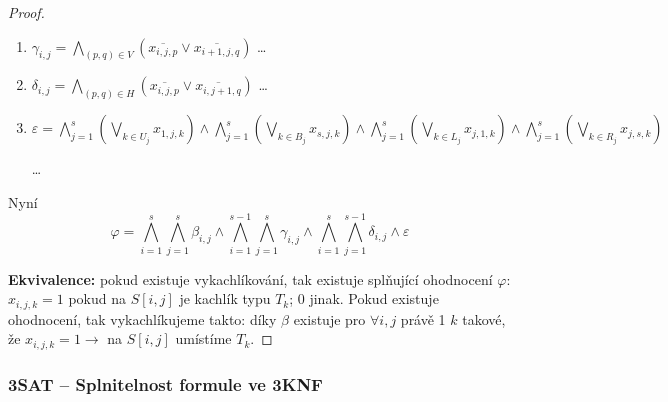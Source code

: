 \documentclass[11pt]{report} %
\numberwithin{equation}{section}
\begin{document}
\begin{proof}
\begin{enumerate}
\begin{enumerate}
		\item $\gamma_{i,j} = \bigwedge\limits_{(p,q)\in V} (\overline{x_{i,j,p}} \vee \overline{x_{i+1,j,q}})$ \quad\dots\quad {}
		
		\item $\delta_{i,j} = \bigwedge\limits_{(p,q)\in H} (\overline{x_{i,j,p}} \vee \overline{x_{i,j+1,q}})$ \quad\dots\quad {}
		
		\item $\varepsilon = \bigwedge\limits_{j=1}^{s}\left(\bigvee\limits_{k\in U_j} x_{1,j,k} \right) \wedge \bigwedge\limits_{j=1}^{s}\left(\bigvee\limits_{k\in B_j} x_{s,j,k} \right) \wedge \bigwedge\limits_{j=1}^{s}\left(\bigvee\limits_{k\in L_j} x_{j,1,k} \right) \wedge \bigwedge\limits_{j=1}^{s}\left(\bigvee\limits_{k\in R_j} x_{j,s,k} \right)$ 
		\medskip
		
		\quad\dots\quad {}
	\end{enumerate}

	Nyní
	$$\varphi = \bigwedge\limits_{i=1}^{s}\bigwedge\limits_{j=1}^{s} \beta_{i,j} \wedge \bigwedge\limits_{i=1}^{s-1}\bigwedge\limits_{j=1}^{s} \gamma_{i,j} \wedge \bigwedge\limits_{i=1}^{s}\bigwedge\limits_{j=1}^{s-1}\delta_{i,j} \wedge \varepsilon$$
\end{enumerate}

\textbf{Ekvivalence:} pokud existuje vykachlíkování, tak existuje splňující ohodnocení $\varphi$: $x_{i,j,k} = 1$ pokud na $S[i,j]$ je kachlík typu $T_k$; 0 jinak. Pokud existuje ohodnocení, tak vykachlíkujeme takto: díky $\beta$ existuje pro $\forall i,j$ právě 1 $k$ takové, že $x_{i,j,k} = 1 \rightarrow$ na $S[i,j]$ umístíme $T_k$.
\end{proof}

\subsubsection{3SAT -- Splnitelnost formule ve 3KNF}
\begin{minipage}{\textwidth}
	\bigskip
	\centering
	\bigskip
\end{minipage}
\end{document}

